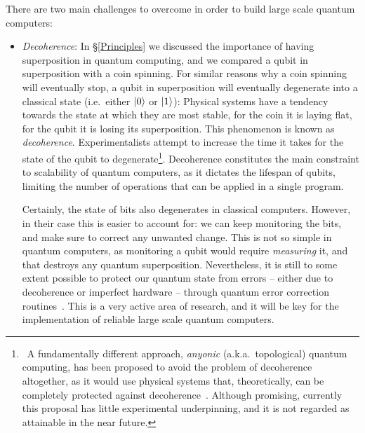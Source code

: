 There are two main challenges to overcome in order to build large scale quantum computers:

\begin{itemize}

  \item \textit{Decoherence}: In \S\ref{Principles} we discussed the importance of having superposition in quantum computing, and we compared a qubit in superposition with a coin spinning. For similar reasons why a coin spinning will eventually stop, a qubit in superposition will eventually degenerate into a classical state (i.e.\ either \(\vert 0 \rangle\) or \(\vert 1 \rangle\)): Physical systems have a tendency towards the state at which they are most stable, for the coin it is laying flat, for the qubit it is losing its superposition. This phenomenon is known as \textit{decoherence}. Experimentalists attempt to increase the time it takes for the state of the qubit to degenerate\footnote{\, A fundamentally different approach, \textit{anyonic} (a.k.a.\ topological) quantum computing, has been proposed to avoid the problem of decoherence altogether, as it would use physical systems that, theoretically, can be completely protected against decoherence~\citep{Anyonic}. Although promising, currently this proposal has little experimental underpinning, and it is not regarded as attainable in the near future.}. Decoherence constitutes the main constraint to scalability of quantum computers, as it dictates the lifespan of qubits, limiting the number of operations that can be applied in a single program. 

  Certainly, the state of bits also degenerates in classical computers. However, in their case this is easier to account for: we can keep monitoring the bits, and make sure to correct any unwanted change. This is not so simple in quantum computers, as monitoring a qubit would require \textit{measuring} it, and that destroys any quantum superposition. Nevertheless, it is still to some extent possible to protect our quantum state from errors -- either due to decoherence or imperfect hardware -- through quantum error correction routines~\citep{QuantumErrorCorrection}. This is a very active area of research, and it will be key for the implementation of reliable large scale quantum computers.



\end{itemize}
